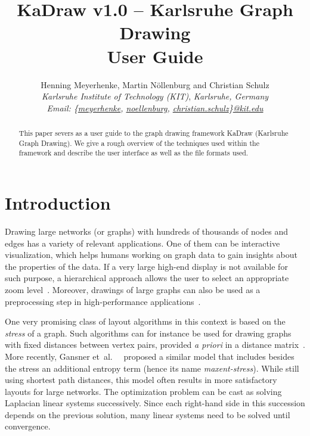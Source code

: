 \documentclass[11pt]{article}
\newcommand{\etal}{et~al.\ }
\newcommand{\mytitle}{ {\color{red}KaDraw} v1.0 -- {\color{red}Ka}rlsruhe Graph {\color{red}Draw}ing \\ User Guide}
\begin{document}
\title{\mytitle}
\author{Henning Meyerhenke, Martin Nöllenburg and Christian Schulz\\ 
	\textit{Karlsruhe Institute of Technology (KIT)},
	\textit{Karlsruhe, Germany} \\
	\textit{Email: \{\url{meyerhenke}, \url{noellenburg}, \url{christian.schulz}\}\url{@kit.edu}} }
\date{}

\maketitle
\begin{abstract}
This paper severs as a user guide to the graph drawing framework KaDraw (Karlsruhe Graph Drawing). We give a rough overview of the techniques used within the framework and describe the user interface as well as the file formats used. 
\end{abstract}

\tableofcontents
\thispagestyle{empty}

\vfill
\pagebreak
\section{Introduction}
Drawing large networks (or graphs) with hundreds of thousands of nodes and
edges has a variety of relevant applications. One of them can be interactive visualization, which helps humans working on
graph data to gain insights about the properties of the data. If a very large high-end display is not available for such
purpose, a hierarchical approach allows the user to select an appropriate zoom level~\cite{abello-ask-06}.
Moreover, drawings of large graphs can also be used as a preprocessing step in high-performance applications~\cite{Kirmani:2013:SPG:2503210.2503280}.

One very promising class of layout algorithms in this context is based on the
\emph{stress} of a graph. Such algorithms can for instance be used for drawing graphs with fixed
distances between vertex pairs, provided \textit{a priori} in a distance matrix~\cite{gkn-gdsm-05}.
%
More recently, Gansner \etal~\cite{ghn-mmgl-13} proposed a similar model 
that includes besides the stress an additional entropy term (hence its name \emph{maxent-stress}). 
While still using shortest path distances, this model often results in more satisfactory layouts for large networks.
The optimization problem can be cast as solving Laplacian 
linear systems successively. Since each right-hand side in this succession 
depends on the previous solution, many linear systems need
to be solved until convergence.
\end{document}
